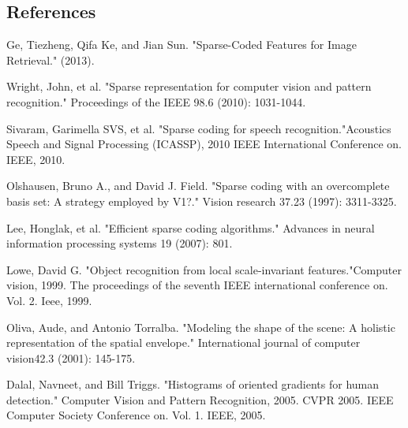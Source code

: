 \documentclass[letterpaper]{article}
\begin{document}

\subsection{References} 
Ge, Tiezheng, Qifa Ke, and Jian Sun. "Sparse-Coded Features for Image Retrieval." (2013).

Wright, John, et al. "Sparse representation for computer vision and pattern recognition." Proceedings of the IEEE 98.6 (2010): 1031-1044.

Sivaram, Garimella SVS, et al. "Sparse coding for speech recognition."Acoustics Speech and Signal Processing (ICASSP), 2010 IEEE International Conference on. IEEE, 2010.

Olshausen, Bruno A., and David J. Field. "Sparse coding with an overcomplete basis set: A strategy employed by V1?." Vision research 37.23 (1997): 3311-3325.

Lee, Honglak, et al. "Efficient sparse coding algorithms." Advances in neural information processing systems 19 (2007): 801.

Lowe, David G. "Object recognition from local scale-invariant features."Computer vision, 1999. The proceedings of the seventh IEEE international conference on. Vol. 2. Ieee, 1999.

Oliva, Aude, and Antonio Torralba. "Modeling the shape of the scene: A holistic representation of the spatial envelope." International journal of computer vision42.3 (2001): 145-175.

Dalal, Navneet, and Bill Triggs. "Histograms of oriented gradients for human detection." Computer Vision and Pattern Recognition, 2005. CVPR 2005. IEEE Computer Society Conference on. Vol. 1. IEEE, 2005.
\end{document}
